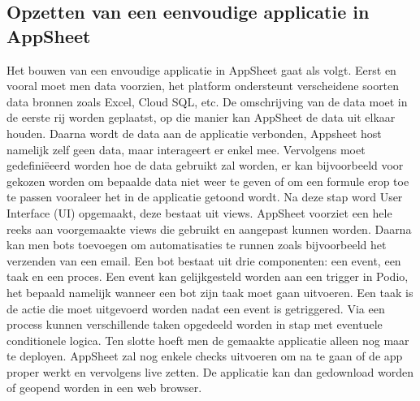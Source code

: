 \subsection{Opzetten van een eenvoudige applicatie in AppSheet}


Het bouwen van een envoudige applicatie in AppSheet gaat als volgt. Eerst en vooral moet men data voorzien, het platform ondersteunt verscheidene soorten data bronnen zoals Excel, Cloud SQL, etc. De omschrijving van de data moet in de eerste rij worden geplaatst, op die manier kan AppSheet de data uit elkaar houden. Daarna wordt de data aan de applicatie verbonden, Appsheet host namelijk zelf geen data, maar interageert er enkel mee. Vervolgens moet gedefiniëeerd worden hoe de data gebruikt zal worden, er kan bijvoorbeeld voor gekozen worden om bepaalde data niet weer te geven of om een formule erop toe te passen vooraleer het in de applicatie getoond wordt. Na deze stap word User Interface (UI) opgemaakt, deze bestaat uit views. AppSheet voorziet een hele reeks aan voorgemaakte views die gebruikt en aangepast kunnen worden.  Daarna kan men bots toevoegen om automatisaties te runnen zoals bijvoorbeeld het verzenden van een email. Een bot bestaat uit drie componenten: een event, een taak en een proces. Een event kan gelijkgesteld worden aan een trigger in Podio, het bepaald namelijk wanneer een bot zijn taak moet gaan uitvoeren. Een taak is de actie die moet uitgevoerd worden nadat een event is getriggered. Via een process kunnen verschillende taken opgedeeld worden in stap met eventuele conditionele logica. Ten slotte hoeft men de gemaakte applicatie alleen nog maar te deployen. AppSheet zal nog enkele checks uitvoeren om na te gaan of de app proper werkt en vervolgens live zetten. De applicatie kan dan gedownload worden of geopend worden in een web browser. 
\autocite{https://about.appsheet.com/how-to-create-an-app}
